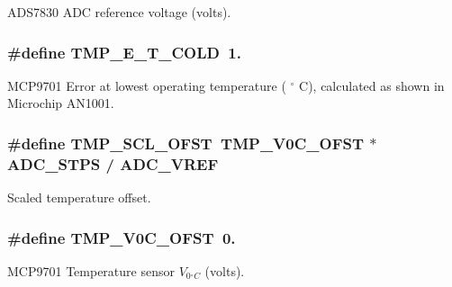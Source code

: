 A\-D\-S7830 A\-D\-C reference voltage (volts). \hypertarget{a00041_acc66f9f90ea4746679f5d26c834ddea5}{
\subsubsection[{T\-M\-P\-\_\-\-E\-\_\-\-T\-\_\-\-C\-O\-L\-D}]{\setlength{\rightskip}{0pt plus 5cm}\#define T\-M\-P\-\_\-\-E\-\_\-\-T\-\_\-\-C\-O\-L\-D~1.}}\label{a00041_acc66f9f90ea4746679f5d26c834ddea5}
M\-C\-P9701 Error at lowest operating temperature ( $ ^\circ$ C), calculated as shown in Microchip A\-N1001. \hypertarget{a00041_a0f910bb108922c8686a139977510af53}{
\subsubsection[{T\-M\-P\-\_\-\-S\-C\-L\-\_\-\-O\-F\-S\-T}]{\setlength{\rightskip}{0pt plus 5cm}\#define T\-M\-P\-\_\-\-S\-C\-L\-\_\-\-O\-F\-S\-T~{\bf T\-M\-P\-\_\-\-V0\-C\-\_\-\-O\-F\-S\-T} $\ast$ {\bf A\-D\-C\-\_\-\-S\-T\-P\-S} / {\bf A\-D\-C\-\_\-\-V\-R\-E\-F}}}\label{a00041_a0f910bb108922c8686a139977510af53}
Scaled temperature offset. \hypertarget{a00041_a6d41a70e126c748f2c99c3ff8228eb1b}{
\subsubsection[{T\-M\-P\-\_\-\-V0\-C\-\_\-\-O\-F\-S\-T}]{\setlength{\rightskip}{0pt plus 5cm}\#define T\-M\-P\-\_\-\-V0\-C\-\_\-\-O\-F\-S\-T~0.}}\label{a00041_a6d41a70e126c748f2c99c3ff8228eb1b}
M\-C\-P9701 Temperature sensor $ V_{0{^\circ}C}$ (volts). 

